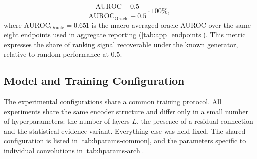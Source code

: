 \begin{equation}
\frac{\mathrm{AUROC} - 0.5}{\mathrm{AUROC}_{\mathrm{Oracle}} - 0.5} \cdot 100\%,
\label{eq:pct-ceiling}
\end{equation}
%
where $\mathrm{AUROC}_{\mathrm{Oracle}} = 0.651$ is the macro-averaged oracle
AUROC over the same eight endpoints used in aggregate reporting
(\cref{tab:app_endpoints}). This metric expresses the share of ranking
signal recoverable under the known generator, relative to random performance
at $0.5$.

\subsection{Model and Training Configuration}
\label{sec:taskB-config}

The experimental configurations share a common training protocol.
All experiments share the same encoder structure and differ only in a small
number of hyperparameters: the number of layers $L$, the presence of a
residual connection and the statistical-evidence variant. Everything
else was held fixed. The shared configuration is listed in
\cref{tab:hparams-common}, and the parameters specific to individual
convolutions in \cref{tab:hparams-arch}.

